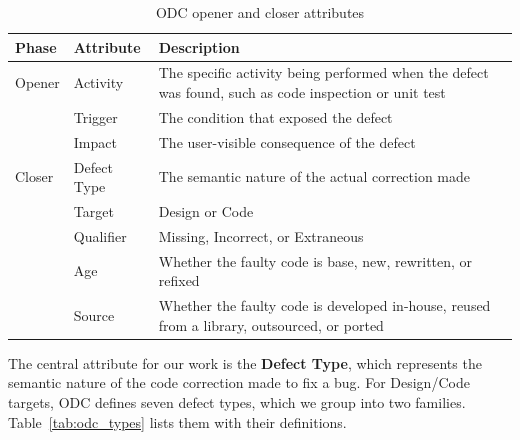 \documentclass{iutbscthesis}
\begin{document}
\begin{table}[!htbp]
    \centering
    \begin{tabular}{l l p{8.2cm}}
        \toprule
        \textbf{Phase} & \textbf{Attribute} & \textbf{Description} \\
        \midrule
        Opener & Activity    & The specific activity being performed when the defect was found, such as code inspection or unit test \\
               & Trigger     & The condition that exposed the defect \\
               & Impact      & The user-visible consequence of the defect \\
        \midrule
        Closer & Defect Type & The semantic nature of the actual correction made \\
               & Target      & Design or Code \\
               & Qualifier   & Missing, Incorrect, or Extraneous \\
               & Age         & Whether the faulty code is base, new, rewritten, or refixed \\
               & Source      & Whether the faulty code is developed in-house, reused from a library, outsourced, or ported \\
        \bottomrule
    \end{tabular}
    \caption{ODC opener and closer attributes \cite{ibm2013odc}}
    \label{tab:odc_attributes}
\end{table}

The central attribute for our work is the \textbf{Defect Type}, which represents the semantic nature of the code correction made to fix a bug. For Design/Code targets, ODC defines seven defect types, which we group into two families. Table~\ref{tab:odc_types} lists them with their definitions.
\end{document}

